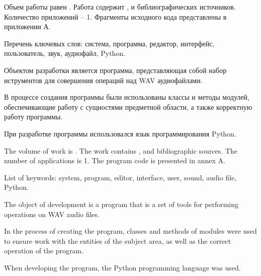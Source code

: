 
Объем работы равен . Работа содержит ,  и  библиографических источников. Количество приложений – 1. Фрагменты исходного кода представлены в приложении А.

Перечень ключевых слов: система, программа, редактор, интерфейс, пользователь, звук, аудиофайл, Python.

Объектом разработки является программа, представляющая собой набор иструментов для совершения операций над WAV аудиофайлами.

В процессе создания программы были использованы классы и методы модулей, обеспечивающие работу с сущностями предметной области, а также корректную работу программы.

При разработке программы использовался язык программирования Python.

  
The volume of work is . The work contains ,  and  bibliographic sources. The number of applications is 1. The program code is presented in annex A.

List of keywords: system, program, editor, interface, user, sound, audio file, Python.

The object of development is a program that is a set of tools for performing operations on WAV audio files.

In the process of creating the program, classes and methods of modules were used to ensure work with the entities of the subject area, as well as the correct operation of the program.

When developing the program, the Python programming language was used.
